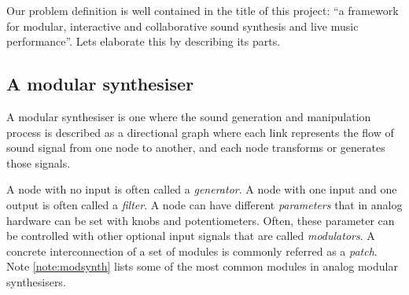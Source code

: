 Our problem definition is well contained in the title of this project:
``a framework for modular, interactive and collaborative sound
synthesis and live music performance''. Lets elaborate this by
describing its parts.

\subsection{A modular synthesiser}
\label{sec:defmodular}

A modular synthesiser is one where the
sound generation and manipulation process is described as a
directional graph where each link represents the flow of sound signal
from one node to another, and each node transforms or generates those
signals.

A node with no input is often called a
\emph{generator}. A node with one input and one
output is often called a \emph{filter}. A node can have
different \emph{parameters} that
in analog hardware can be set with knobs and potentiometers. Often,
these parameter can be controlled with other optional input signals
that are called \emph{modulators}. A concrete
interconnection of a set of modules is commonly referred as a
\emph{patch}. Note \ref{note:modsynth} lists some of the
most common modules in analog modular synthesisers.


